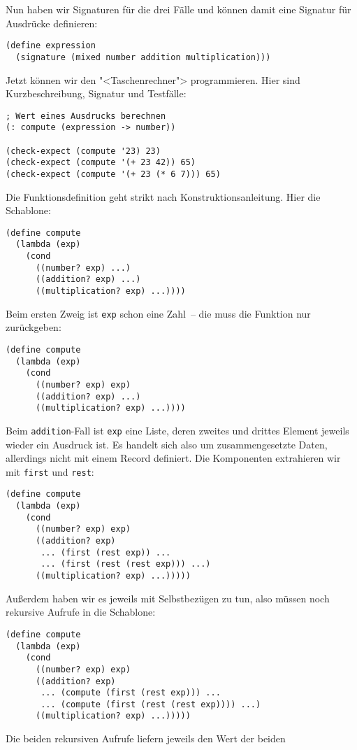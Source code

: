 %
Nun haben wir Signaturen für die drei Fälle und können damit eine
Signatur für Ausdrücke definieren:
%
\begin{lstlisting}
(define expression
  (signature (mixed number addition multiplication)))
\end{lstlisting}
%
Jetzt können wir den "<Taschenrechner"> programmieren.  Hier sind
Kurzbeschreibung, Signatur und Testfälle:
%
\begin{lstlisting}
; Wert eines Ausdrucks berechnen
(: compute (expression -> number))

(check-expect (compute '23) 23)
(check-expect (compute '(+ 23 42)) 65)
(check-expect (compute '(+ 23 (* 6 7))) 65)
\end{lstlisting}
%
Die Funktionsdefinition geht strikt nach Konstruktionsanleitung.  Hier
die Schablone:
%
\begin{lstlisting}
(define compute
  (lambda (exp)
    (cond
      ((number? exp) ...)
      ((addition? exp) ...)
      ((multiplication? exp) ...))))
\end{lstlisting}
%
Beim ersten Zweig ist \lstinline{exp} schon eine Zahl~-- die muss die
Funktion nur zurückgeben:
%
\begin{lstlisting}
(define compute
  (lambda (exp)
    (cond
      ((number? exp) exp)
      ((addition? exp) ...)
      ((multiplication? exp) ...))))
\end{lstlisting}
%
Beim \lstinline{addition}-Fall ist \lstinline{exp} eine Liste, deren
zweites und drittes Element jeweils wieder ein Ausdruck ist.  Es
handelt sich also um zusammengesetzte Daten, allerdings nicht mit
einem Record definiert.  Die Komponenten extrahieren wir mit
\lstinline{first} und \lstinline{rest}:
%
\begin{lstlisting}
(define compute
  (lambda (exp)
    (cond
      ((number? exp) exp)
      ((addition? exp)
       ... (first (rest exp)) ...
       ... (first (rest (rest exp))) ...)
      ((multiplication? exp) ...)))))
\end{lstlisting}
%
Außerdem haben wir es jeweils mit Selbstbezügen zu tun, also müssen noch
rekursive Aufrufe in die Schablone:
%
\begin{lstlisting}
(define compute
  (lambda (exp)
    (cond
      ((number? exp) exp)
      ((addition? exp)
       ... (compute (first (rest exp))) ...
       ... (compute (first (rest (rest exp)))) ...)
      ((multiplication? exp) ...)))))
\end{lstlisting}
%
Die beiden rekursiven Aufrufe liefern jeweils den Wert der beiden
